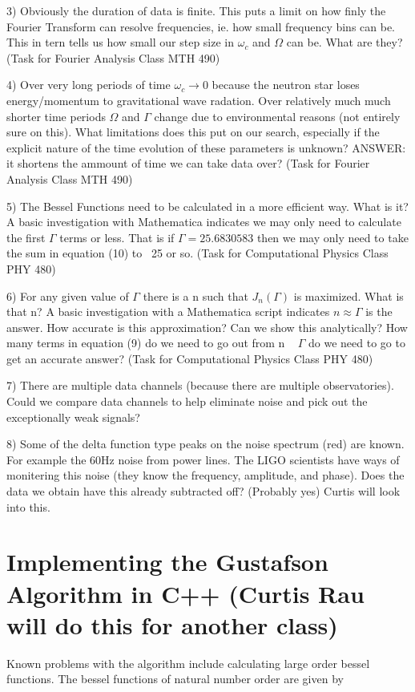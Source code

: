 \documentclass[twocolumn, groupedaddress]{revtex4-1}
\begin{document}
3) Obviously the duration of data is finite.  This puts a limit on how finly the Fourier Transform can resolve frequencies, ie. how small frequency bins can be.  This in tern tells us how small our step size in $\omega_c$ and $\Omega$ can be.  What are they? (Task for Fourier Analysis Class MTH 490)

4) Over very long periods of time $\omega_c \to 0$ because the neutron star loses energy/momentum to gravitational wave radation.  Over relatively much much shorter time periods $\Omega$ and $\Gamma$ change due to environmental reasons (not entirely sure on this).  What limitations does this put on our search, especially if the explicit nature of the time evolution of these parameters is unknown? ANSWER: it shortens the ammount of time we can take data over? (Task for Fourier Analysis Class MTH 490)

5) The Bessel Functions need to be calculated in a more efficient way.  What is it?  A basic investigation with Mathematica indicates we may only need to calculate the first $\Gamma$ terms or less.  That is if $\Gamma = 25.6830583$ then we may only need to take the sum in equation (10) to ~25 or so. (Task for Computational Physics Class PHY 480)

6) For any given value of $\Gamma$ there is a n such that $J_n(\Gamma)$ is maximized.  What is that n?  A basic investigation with a Mathematica script indicates $n \approx \Gamma$ is the answer.  How accurate is this approximation?  Can we show this analytically?  How many terms in equation (9) do we need to go out from n ~ $\Gamma$ do we need to go to get an accurate answer? (Task for Computational Physics Class PHY 480)

7) There are multiple data channels (because there are multiple observatories).  Could we compare data channels to help eliminate noise and pick out the exceptionally weak signals?

8) Some of the delta function type peaks on the noise spectrum (red) are known.  For example the 60Hz noise from power lines.  The LIGO scientists have ways of monitering this noise (they know the frequency, amplitude, and phase).  Does the data we obtain have this already subtracted off?  (Probably yes)  Curtis will look into this.

\section{Implementing the Gustafson Algorithm in C++ (Curtis Rau will do this for another class)}
Known problems with the algorithm include calculating large order bessel functions.  The bessel functions of natural number order are given by
\end{document}
